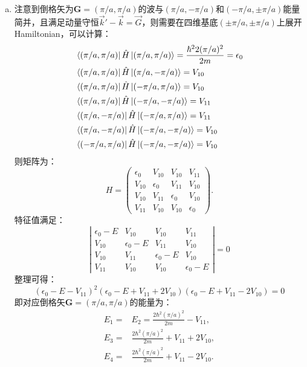 \documentclass[reqno,a4paper,12pt]{amsart}
\begin{document}
\begin{enumerate}[1.]
\begin{tcolorbox}[breakable, colback = black!5!white, colframe = black]
\begin{enumerate}[(a)]
\item 注意到倒格矢为$\mathbf{G} = (\pi/a,\pi/a)$的波与$(\pi/a,-\pi/a)$和$(-\pi/a,\pm\pi/a)$能量简并，且满足动量守恒$\vec{k}' - \vec{k} = \vec{G}$，则需要在四维基底$(\pm \pi/a, \pm \pi/a)$上展开Hamiltonian，可以计算：
\begin{align*}
	&\bra{(\pi/a,\pi/a)} \hat{H} \ket{(\pi/a,\pi/a)} = \frac{\hbar^22(\pi/a)^2}{2m} = \epsilon_0 \\
	&\bra{(\pi/a,\pi/a)} \hat{H} \ket{(\pi/a, -\pi/a)} = V_{10} \\
	&\bra{(\pi/a,\pi/a)} \hat{H} \ket{(-\pi/a,\pi/a)} = V_{10} \\
	&\bra{(\pi/a,\pi/a)} \hat{H} \ket{(-\pi/a,-\pi/a)} = V_{11} \\
	&\bra{(\pi/a,-\pi/a)} \hat{H} \ket{(-\pi/a,\pi/a)} = V_{11} \\
	&\bra{(\pi/a,-\pi/a)} \hat{H} \ket{(-\pi/a,-\pi/a)} = V_{10} \\
	&\bra{(-\pi/a,\pi/a)} \hat{H} \ket{(-\pi/a,-\pi/a)} = V_{10} 
\end{align*}
则矩阵为：
\[
	H = \begin{pmatrix}
		\epsilon_0 & V_{10} & V_{10} & V_{11} \\
		V_{10} & \epsilon_0 & V_{11} & V_{10} \\
		V_{10} & V_{11} & \epsilon_0 & V_{10} \\
		V_{11} & V_{10} & V_{10} & \epsilon_0
	\end{pmatrix}.
\]
特征值满足：
\[
	\left\vert \begin{matrix}
		\epsilon_0-E & V_{10} & V_{10} & V_{11} \\
		V_{10} & \epsilon_0-E & V_{11} & V_{10} \\
		V_{10} & V_{11} & \epsilon_0-E & V_{10} \\
		V_{11} & V_{10} & V_{10} & \epsilon_0-E
	\end{matrix} \right\vert = 0
\]
整理可得：
\[
	(\epsilon_0-E-V_{11})^2(\epsilon_0-E+V_{11}+2V_{10})(\epsilon_0-E+V_{11}-2V_{10}) = 0
\]
即对应倒格矢$\mathbf{G} = (\pi/a,\pi/a)$的能量为：
\begin{align*}
	E_1 =& E_2 = \frac{2\hbar^2(\pi/a)^2}{2m} - V_{11}, \\ 
	E_3 =& \frac{2\hbar^2(\pi/a)^2}{2m} + V_{11} + 2V_{10}, \\
	E_4 =& \frac{2\hbar^2(\pi/a)^2}{2m} + V_{11} - 2V_{10}.
\end{align*}
\end{enumerate}
\end{tcolorbox}


\end{enumerate}
\end{document}
